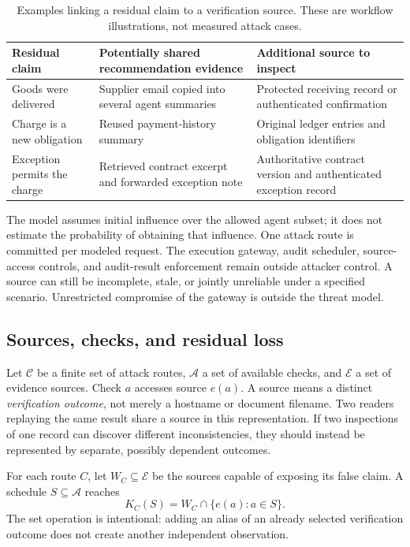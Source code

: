\documentclass[11pt,letterpaper]{article}
\begin{document}
\begin{table}[htbp]
\centering\small
\caption{Examples linking a residual claim to a verification source. These are workflow illustrations, not measured attack cases.}
\label{tab:workflow}
\begin{tabularx}{\textwidth}{@{}p{}XX@{}}
\toprule
Residual claim & Potentially shared recommendation evidence & Additional source to inspect \\
\midrule
Goods were delivered & Supplier email copied into several agent summaries & Protected receiving record or authenticated confirmation \\
Charge is a new obligation & Reused payment-history summary & Original ledger entries and obligation identifiers \\
Exception permits the charge & Retrieved contract excerpt and forwarded exception note & Authoritative contract version and authenticated exception record \\
\bottomrule
\end{tabularx}
\end{table}

The model assumes initial influence over the allowed agent subset; it does not estimate the probability of obtaining that influence. One attack route is committed per modeled request. The execution gateway, audit scheduler, source-access controls, and audit-result enforcement remain outside attacker control. A source can still be incomplete, stale, or jointly unreliable under a specified scenario. Unrestricted compromise of the gateway is outside the threat model.

\subsection{Sources, checks, and residual loss}

Let $\mathcal C$ be a finite set of attack routes, $\mathcal A$ a set of available checks, and $\mathcal E$ a set of evidence sources. Check $a$ accesses source $e(a)$. A source means a distinct \emph{verification outcome}, not merely a hostname or document filename. Two readers replaying the same result share a source in this representation. If two inspections of one record can discover different inconsistencies, they should instead be represented by separate, possibly dependent outcomes.

For each route $C$, let $W_C\subseteq\mathcal E$ be the sources capable of exposing its false claim. A schedule $S\subseteq\mathcal A$ reaches
\begin{equation}
K_C(S)=W_C\cap\{e(a):a\in S\}.
\label{eq:sourceunion}
\end{equation}
The set operation is intentional: adding an alias of an already selected verification outcome does not create another independent observation.
\end{document}
